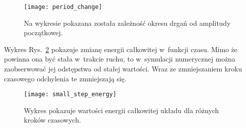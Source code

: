\documentclass[a4paper; 12pt]{article}
\begin{document}
\begin{figure}[h]
    \centering
    \texttt{[image: period\_change]}
    \caption{Na wykresie pokazana została zależność okresu drgań od amplitudy początkowej.}
    \label{fig:periodchange}
\end{figure}

Wykres Rys.~\ref{fig:smallstepenergy} pokazuje zmianę energii całkowitej
w~funkcji czasu.
Mimo że powinna ona być stała w~trakcie ruchu, to w~symulacji numerycznej można
zaobserwować jej odstępstwa od stałej wartości.
Wraz ze zmniejszaniem kroku czasowego odchylenia te zmniejszają się.


\begin{figure}
    \centering
    \texttt{[image: small\_step\_energy]}
    \caption{Wykres pokazuje wartości energii całkowitej układu dla różnych
        kroków czasowych.}
    \label{fig:smallstepenergy}
\end{figure}

\end{document}
